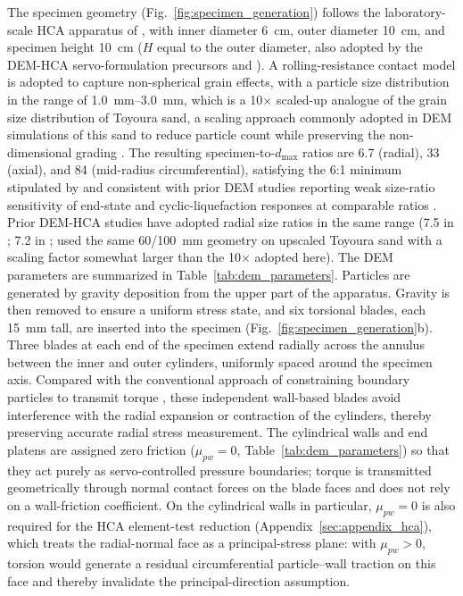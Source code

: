 The specimen geometry (Fig.~\ref{fig:specimen_generation}) follows the laboratory-scale HCA apparatus of \citet{Vargas2020}, with inner diameter \SI{6}{cm}, outer diameter \SI{10}{cm}, and specimen height \SI{10}{cm} ($H$ equal to the outer diameter, also adopted by the DEM-HCA servo-formulation precursors \citet{Han2024jgs} and \citet{Ma2024}). A rolling-resistance contact model \citep{IwashitaOda1998,WensrichKatterfeld2012} is adopted to capture non-spherical grain effects, with a particle size distribution in the range of \SIrange{1.0}{3.0}{mm}, which is a 10$\times$ scaled-up analogue of the grain size distribution of Toyoura sand, a scaling approach commonly adopted in DEM simulations of this sand to reduce particle count while preserving the non-dimensional grading \citep{Song2024}. The resulting specimen-to-$d_{\max}$ ratios are 6.7 (radial), 33 (axial), and 84 (mid-radius circumferential), satisfying the 6:1 minimum stipulated by \citet{ASTM_D7181,ASTM_D4767} and consistent with prior DEM studies reporting weak size-ratio sensitivity of end-state and cyclic-liquefaction responses at comparable ratios \citep{Huang2014,KuhnRenken2014}. Prior DEM-HCA studies have adopted radial size ratios in the same range (7.5 in \citealt{Shi2021}; 7.2 in \citealt{Liu2021}; \citealt{Song2024} used the same 60/100~mm geometry on upscaled Toyoura sand with a scaling factor somewhat larger than the 10$\times$ adopted here). The DEM parameters are summarized in Table~\ref{tab:dem_parameters}. Particles are generated by gravity deposition from the upper part of the apparatus. Gravity is then removed to ensure a uniform stress state, and six torsional blades, each 15~mm tall, are inserted into the specimen (Fig.~\ref{fig:specimen_generation}b). Three blades at each end of the specimen extend radially across the annulus between the inner and outer cylinders, uniformly spaced around the specimen axis. Compared with the conventional approach of constraining boundary particles to transmit torque \citep[e.g.,][]{LiZhangGutierrez2015,Liu2021}, these independent wall-based blades avoid interference with the radial expansion or contraction of the cylinders, thereby preserving accurate radial stress measurement. The cylindrical walls and end platens are assigned zero friction ($\mu_{pw}=0$, Table~\ref{tab:dem_parameters}) so that they act purely as servo-controlled pressure boundaries; torque is transmitted geometrically through normal contact forces on the blade faces and does not rely on a wall-friction coefficient. On the cylindrical walls in particular, $\mu_{pw}=0$ is also required for the HCA element-test reduction (Appendix~\ref{sec:appendix_hca}), which treats the radial-normal face as a principal-stress plane: with $\mu_{pw}>0$, torsion would generate a residual circumferential particle--wall traction on this face and thereby invalidate the principal-direction assumption.

